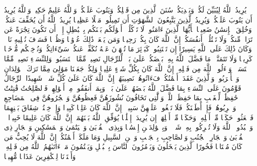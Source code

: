 \stopbuffer
\startbuffer[\q:4:26]
یُرِیدُ ٱللَّهُ لِیُبَیِّنَ لَكُمۡ وَیَهۡدِیَكُمۡ سُنَنَ ٱلَّذِینَ مِن قَبۡلِكُمۡ وَیَتُوبَ عَلَیۡكُمۡۗ وَٱللَّهُ عَلِیمٌ حَكِیمࣱ%
\stopbuffer
\startbuffer[\q:4:27]
وَٱللَّهُ یُرِیدُ أَن یَتُوبَ عَلَیۡكُمۡ وَیُرِیدُ ٱلَّذِینَ یَتَّبِعُونَ ٱلشَّهَوَٰتِ أَن تَمِیلُوا۟ مَیۡلًا عَظِیمࣰا%
\stopbuffer
\startbuffer[\q:4:28]
یُرِیدُ ٱللَّهُ أَن یُخَفِّفَ عَنكُمۡۚ وَخُلِقَ ٱلۡإِنسَٰنُ ضَعِیفࣰا%
\stopbuffer
\startbuffer[\q:4:29]
یَٰۤأَیُّهَا ٱلَّذِینَ ءَامَنُوا۟ لَا تَأۡكُلُوۤا۟ أَمۡوَٰلَكُم بَیۡنَكُم بِٱلۡبَٰطِلِ إِلَّاۤ أَن تَكُونَ تِجَٰرَةً عَن تَرَاضࣲ مِّنكُمۡۚ وَلَا تَقۡتُلُوۤا۟ أَنفُسَكُمۡۚ إِنَّ ٱللَّهَ كَانَ بِكُمۡ رَحِیمࣰا%
\stopbuffer
\startbuffer[\q:4:30]
وَمَن یَفۡعَلۡ ذَٰلِكَ عُدۡوَٰنࣰا وَظُلۡمࣰا فَسَوۡفَ نُصۡلِیهِ نَارࣰاۚ وَكَانَ ذَٰلِكَ عَلَى ٱللَّهِ یَسِیرًا%
\stopbuffer
\startbuffer[\q:4:31]
إِن تَجۡتَنِبُوا۟ كَبَاۤئِرَ مَا تُنۡهَوۡنَ عَنۡهُ نُكَفِّرۡ عَنكُمۡ سَیِّءَاتِكُمۡ وَنُدۡخِلۡكُم مُّدۡخَلࣰا كَرِیمࣰا%
\stopbuffer
\startbuffer[\q:4:32]
وَلَا تَتَمَنَّوۡا۟ مَا فَضَّلَ ٱللَّهُ بِهِۦ بَعۡضَكُمۡ عَلَىٰ بَعۡضࣲۚ لِّلرِّجَالِ نَصِیبࣱ مِّمَّا ٱكۡتَسَبُوا۟ۖ وَلِلنِّسَاۤءِ نَصِیبࣱ مِّمَّا ٱكۡتَسَبۡنَۚ وَسۡءَلُوا۟ ٱللَّهَ مِن فَضۡلِهِۦۤۚ إِنَّ ٱللَّهَ كَانَ بِكُلِّ شَیۡءٍ عَلِیمࣰا%
\stopbuffer
\startbuffer[\q:4:33]
وَلِكُلࣲّ جَعَلۡنَا مَوَٰلِیَ مِمَّا تَرَكَ ٱلۡوَٰلِدَانِ وَٱلۡأَقۡرَبُونَۚ وَٱلَّذِینَ عَقَدَتۡ أَیۡمَٰنُكُمۡ فَءَاتُوهُمۡ نَصِیبَهُمۡۚ إِنَّ ٱللَّهَ كَانَ عَلَىٰ كُلِّ شَیۡءࣲ شَهِیدًا%
\stopbuffer
\startbuffer[\q:4:34]
ٱلرِّجَالُ قَوَّٰمُونَ عَلَى ٱلنِّسَاۤءِ بِمَا فَضَّلَ ٱللَّهُ بَعۡضَهُمۡ عَلَىٰ بَعۡضࣲ وَبِمَاۤ أَنفَقُوا۟ مِنۡ أَمۡوَٰلِهِمۡۚ فَٱلصَّٰلِحَٰتُ قَٰنِتَٰتٌ حَٰفِظَٰتࣱ لِّلۡغَیۡبِ بِمَا حَفِظَ ٱللَّهُۚ وَٱلَّٰتِی تَخَافُونَ نُشُوزَهُنَّ فَعِظُوهُنَّ وَٱهۡجُرُوهُنَّ فِی ٱلۡمَضَاجِعِ وَٱضۡرِبُوهُنَّۖ فَإِنۡ أَطَعۡنَكُمۡ فَلَا تَبۡغُوا۟ عَلَیۡهِنَّ سَبِیلًاۗ إِنَّ ٱللَّهَ كَانَ عَلِیࣰّا كَبِیرࣰا%
\stopbuffer
\startbuffer[\q:4:35]
وَإِنۡ خِفۡتُمۡ شِقَاقَ بَیۡنِهِمَا فَٱبۡعَثُوا۟ حَكَمࣰا مِّنۡ أَهۡلِهِۦ وَحَكَمࣰا مِّنۡ أَهۡلِهَاۤ إِن یُرِیدَاۤ إِصۡلَٰحࣰا یُوَفِّقِ ٱللَّهُ بَیۡنَهُمَاۤۗ إِنَّ ٱللَّهَ كَانَ عَلِیمًا خَبِیرࣰا%
\stopbuffer
\startbuffer[\q:4:36]
۞ وَٱعۡبُدُوا۟ ٱللَّهَ وَلَا تُشۡرِكُوا۟ بِهِۦ شَیۡءࣰاۖ وَبِٱلۡوَٰلِدَیۡنِ إِحۡسَٰنࣰا وَبِذِی ٱلۡقُرۡبَىٰ وَٱلۡیَتَٰمَىٰ وَٱلۡمَسَٰكِینِ وَٱلۡجَارِ ذِی ٱلۡقُرۡبَىٰ وَٱلۡجَارِ ٱلۡجُنُبِ وَٱلصَّاحِبِ بِٱلۡجَنۢبِ وَٱبۡنِ ٱلسَّبِیلِ وَمَا مَلَكَتۡ أَیۡمَٰنُكُمۡۗ إِنَّ ٱللَّهَ لَا یُحِبُّ مَن كَانَ مُخۡتَالࣰا فَخُورًا%
\stopbuffer
\startbuffer[\q:4:37]
ٱلَّذِینَ یَبۡخَلُونَ وَیَأۡمُرُونَ ٱلنَّاسَ بِٱلۡبُخۡلِ وَیَكۡتُمُونَ مَاۤ ءَاتَىٰهُمُ ٱللَّهُ مِن فَضۡلِهِۦۗ وَأَعۡتَدۡنَا لِلۡكَٰفِرِینَ عَذَابࣰا مُّهِینࣰا%
